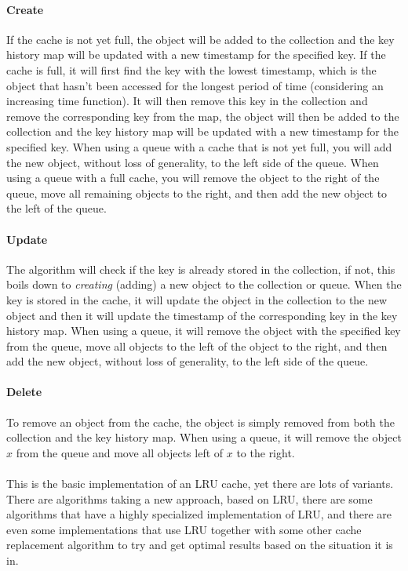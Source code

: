 \documentclass[pdftex,a4paper,12pt,twoside]{report}
\begin{document}
\paragraph{Create} If the cache is not yet full, the object will be added to the collection and the key history map will be updated with a new timestamp for the specified key. If the cache is full, it will first find the key with the lowest timestamp, which is the object that hasn't been accessed for the longest period of time (considering an increasing time function). It will then remove this key in the collection and remove the corresponding key from the map, the object will then be added to the collection and the key history map will be updated with a new timestamp for the specified key. When using a queue with a cache that is not yet full, you will add the new object, without loss of generality, to the left side of the queue. When using a queue with a full cache, you will remove the object to the right of the queue, move all remaining objects to the right, and then add the new object to the left of the queue.
\paragraph{Update} The algorithm will check if the key is already stored in the collection, if not, this boils down to \emph{creating} (adding) a new object to the collection or queue. When the key is stored in the cache, it will update the object in the collection to the new object and then it will update the timestamp of the corresponding key in the key history map. When using a queue, it will remove the object with the specified key from the queue, move all objects to the left of the object to the right, and then add the new object, without loss of generality, to the left side of the queue.
\paragraph{Delete} To remove an object from the cache, the object is simply removed from both the collection and the key history map. When using a queue, it will remove the object $x$ from the queue and move all objects left of $x$ to the right.
\\\\
\citep{lru_implementation}This is the basic implementation of an LRU cache, yet there are lots of variants. There are algorithms taking a new approach, based on LRU, there are some algorithms that have a highly specialized implementation of LRU, and there are even some implementations that use LRU together with some other cache replacement algorithm to try and get optimal results based on the situation it is in.
\end{document}
